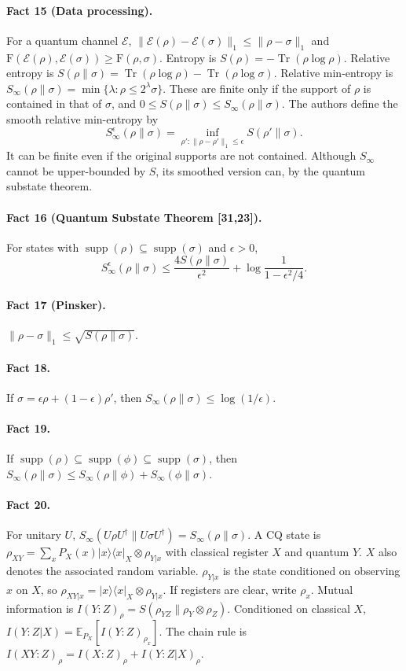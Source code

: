 \documentclass[10pt,a4paper]{article}
\providecommand{\ket}[1]{\lvert#1\rangle}
\providecommand{\bra}[1]{\langle#1\rvert}
\providecommand{\proj}[1]{\ket{#1}\bra{#1}}
\begin{document}
\paragraph{Fact 15 (Data processing).} For a quantum channel $\mathcal E$, $\|\mathcal E(\rho)-\mathcal E(\sigma)\|_1\le\|\rho-\sigma\|_1$ and $\mathrm F(\mathcal E(\rho),\mathcal E(\sigma))\ge\mathrm F(\rho,\sigma)$.
Entropy is $S(\rho)=-\operatorname{Tr}(\rho\log\rho)$. Relative entropy is $S(\rho\|\sigma)=\operatorname{Tr}(\rho\log\rho)-\operatorname{Tr}(\rho\log\sigma)$. Relative min-entropy is $S_\infty(\rho\|\sigma)=\min\{\lambda:\rho\le2^\lambda\sigma\}$. These are finite only if the support of $\rho$ is contained in that of $\sigma$, and $0\le S(\rho\|\sigma)\le S_\infty(\rho\|\sigma)$. The authors define the smooth relative min-entropy by
\[S_\infty^\epsilon(\rho\|\sigma)=\inf_{\rho':\|\rho-\rho'\|_1\le\epsilon}S(\rho'\|\sigma).\]
It can be finite even if the original supports are not contained. Although $S_\infty$ cannot be upper-bounded by $S$, its smoothed version can, by the quantum substate theorem.
\paragraph{Fact 16 (Quantum Substate Theorem [31,23]).} For states with $\operatorname{supp}(\rho)\subseteq\operatorname{supp}(\sigma)$ and $\epsilon>0$,
\[S_\infty^\epsilon(\rho\|\sigma)\le\frac{4S(\rho\|\sigma)}{\epsilon^2}+\log\frac1{1-\epsilon^2/4}.\]
\paragraph{Fact 17 (Pinsker).} $\|\rho-\sigma\|_1\le\sqrt{S(\rho\|\sigma)}$.
\paragraph{Fact 18.} If $\sigma=\epsilon\rho+(1-\epsilon)\rho'$, then $S_\infty(\rho\|\sigma)\le\log(1/\epsilon)$.
\paragraph{Fact 19.} If $\operatorname{supp}(\rho)\subseteq\operatorname{supp}(\phi)\subseteq\operatorname{supp}(\sigma)$, then $S_\infty(\rho\|\sigma)\le S_\infty(\rho\|\phi)+S_\infty(\phi\|\sigma)$.
\paragraph{Fact 20.} For unitary $U$, $S_\infty(U\rho U^\dagger\|U\sigma U^\dagger)=S_\infty(\rho\|\sigma)$.
A CQ state is $\rho_{XY}=\sum_xP_X(x)\proj{x}_X\otimes\rho_{Y|x}$ with classical register $X$ and quantum $Y$. $X$ also denotes the associated random variable. $\rho_{Y|x}$ is the state conditioned on observing $x$ on $X$, so $\rho_{XY|x}=\proj{x}_X\otimes\rho_{Y|x}$. If registers are clear, write $\rho_x$. Mutual information is $I(Y:Z)_\rho=S(\rho_{YZ}\|\rho_Y\otimes\rho_Z)$. Conditioned on classical $X$, $I(Y:Z|X)=\mathbb E_{P_X}[I(Y:Z)_{\rho_x}]$. The chain rule is $I(XY:Z)_\rho=I(X:Z)_\rho+I(Y:Z|X)_\rho$.
\end{document}
